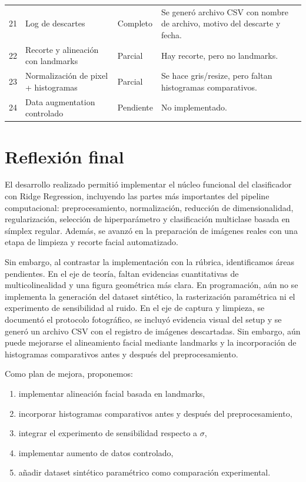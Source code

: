 \documentclass[12pt,a4paper]{article}
\begin{document}
\begin{longtable}{p{1.2cm} p{6cm} p{3cm} p{4.2cm}}
21 & Log de descartes & Completo & Se generó archivo CSV con nombre de archivo, motivo del descarte y fecha. \\
22 & Recorte y alineación con landmarks & Parcial & Hay recorte, pero no landmarks. \\
23 & Normalización de pixel + histogramas & Parcial & Se hace gris/resize, pero faltan histogramas comparativos. \\
24 & Data augmentation controlado & Pendiente & No implementado. \\
\bottomrule
\end{longtable}

\section{Reflexión final}
El desarrollo realizado permitió implementar el núcleo funcional del clasificador con Ridge Regression, incluyendo las partes más importantes del pipeline computacional: preprocesamiento, normalización, reducción de dimensionalidad, regularización, selección de hiperparámetro y clasificación multiclase basada en símplex regular. Además, se avanzó en la preparación de imágenes reales con una etapa de limpieza y recorte facial automatizado.

Sin embargo, al contrastar la implementación con la rúbrica, identificamos áreas pendientes. En el eje de teoría, faltan evidencias cuantitativas de multicolinealidad y una figura geométrica más clara. En programación, aún no se implementa la generación del dataset sintético, la rasterización paramétrica ni el experimento de sensibilidad al ruido. En el eje de captura y limpieza, se documentó el protocolo fotográfico, se incluyó evidencia visual del setup y se generó un archivo CSV con el registro de imágenes descartadas. Sin embargo, aún puede mejorarse el alineamiento facial mediante landmarks y la incorporación de histogramas comparativos antes y después del preprocesamiento.

Como plan de mejora, proponemos:
\begin{enumerate}
    \item implementar alineación facial basada en landmarks,
    \item incorporar histogramas comparativos antes y después del preprocesamiento,
    \item integrar el experimento de sensibilidad respecto a $\sigma$,
    \item implementar aumento de datos controlado,
    \item añadir dataset sintético paramétrico como comparación experimental.
\end{enumerate}
\end{document}

